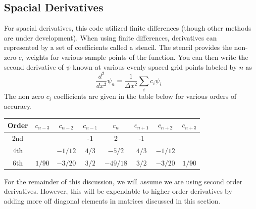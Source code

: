 \documentclass{article}
\begin{document}
\subsection{Spacial Derivatives} %
\label{sub:spacial_derivatives}
For spacial derivatives, this code utilized finite differences (though other methods are under development). When using finite differences, derivatives can represented by a set of coefficients called a stencil. The stencil provides the non-zero $c_i$ weights for various sample points of the function. You can then write the second derivative of $\psi$ known at various evenly spaced grid points labeled by $n$ as
\begin{equation}
    \frac{d^2}{dx^2}\psi_n = \frac{1}{\Delta x^2}\sum_i c_i \psi_i
    \label{eq:finite_diff}
\end{equation}
The non zero $c_i$ coefficients are given in the table below for various orders of accuracy.
\begin{center}
\begin{tabular}{ |c|c|c|c|c|c|c|c| }
\hline
Order & $c_{n-3}$ & $c_{n-2}$ & $c_{n-1}$ & $c_{n}$ & $c_{n+1}$ & $c_{n+2}$ & $c_{n+3}$ \\ \hline
2nd   &      &      & -1   & 2  & -1   &      &      \\ \hline
4th   &      & $-1/12$ & $4/3$   & $-5/2$  & $4/3$   &  $-1/12$    &      \\ \hline
6th   &   $1/90$   &  $-3/20$    & $3/2$   & $-49/18$  & $3/2$   &   $-3/20$    &   $1/90$  \\ \hline
\end{tabular}
\end{center}

For the remainder of this discussion, we will assume we are using second order derivatives. However, this will be expendable to higher order derivatives by adding more off diagonal elements in matrices discussed in this section.
\end{document}
